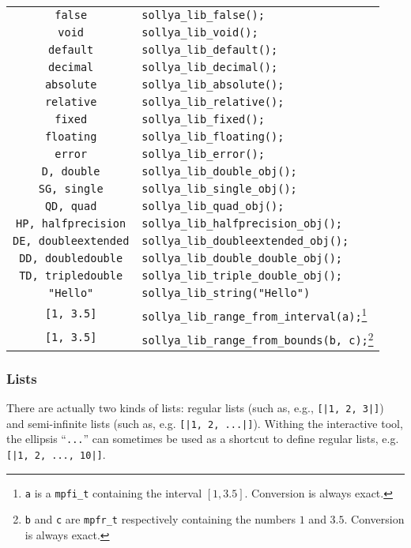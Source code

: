 \documentclass[a4paper]{article}
\begin{document}
\begin{table}[htp]
\begin{minipage}{\textwidth}
\begin{center}
\begin{tabular}{|c|l|}
\verb|false| & \verb|sollya_lib_false();| \\
\verb|void| & \verb|sollya_lib_void();| \\
\verb|default| & \verb|sollya_lib_default();| \\
\verb|decimal| & \verb|sollya_lib_decimal();| \\
\verb|absolute| & \verb|sollya_lib_absolute();| \\
\verb|relative| & \verb|sollya_lib_relative();| \\
\verb|fixed| & \verb|sollya_lib_fixed();| \\
\verb|floating| & \verb|sollya_lib_floating();| \\
\verb|error| & \verb|sollya_lib_error();| \\
\verb|D, double| & \verb|sollya_lib_double_obj();| \\
\verb|SG, single| & \verb|sollya_lib_single_obj();| \\
\verb|QD, quad| & \verb|sollya_lib_quad_obj();| \\
\verb|HP, halfprecision| & \verb|sollya_lib_halfprecision_obj();| \\
\verb|DE, doubleextended| & \verb|sollya_lib_doubleextended_obj();| \\
\verb|DD, doubledouble| & \verb|sollya_lib_double_double_obj();| \\
\verb|TD, tripledouble| & \verb|sollya_lib_triple_double_obj();| \\
\verb|"Hello"| &  \verb|sollya_lib_string("Hello")| \\
\verb|[1, 3.5]| &  \verb|sollya_lib_range_from_interval(a);|\footnote{\texttt{a} is a \texttt{mpfi\_t} containing the interval $[1, 3.5]$. Conversion is always exact.} \\
\verb|[1, 3.5]| &  \verb|sollya_lib_range_from_bounds(b, c);|\footnote[2]{\texttt{b} and \texttt{c} are \texttt{mpfr\_t} respectively containing the numbers $1$ and $3.5$.  Conversion is always exact.} \\ \hline
  \end{tabular}
\end{center}
\end{minipage}
\end{table}

\subsubsection{Lists}
\label{creating_lists}
There are actually two kinds of lists: regular lists (such as, e.g., \verb#[|1, 2, 3|]#) and semi-infinite lists (such as, e.g. \verb#[|1, 2, ...|]#). Withing the interactive tool, the ellipsis ``\texttt{...}'' can sometimes be used as a shortcut to define regular lists, e.g. \verb#[|1, 2, ..., 10|]#.
\end{document}
